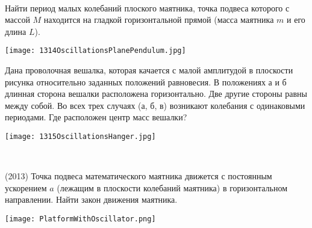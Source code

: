 \begin{ex}
\hspace{0pt} \\
\begin{minipage}{.65\textwidth} 
Найти период малых колебаний плоского маятника, точка подвеса которого с массой $M$ находится на гладкой горизонтальной прямой 
(масса маятника $m$ и его длина $L$).
\end{minipage}
\begin{minipage}{.35\textwidth}
\centering
\texttt{[image: 1314OscillationsPlanePendulum.jpg]}
\end{minipage}
\begin{ans}
\end{ans}
\end{ex}

\begin{ex}
Дана проволочная вешалка, которая качается с малой амплитудой в плоскости рисунка относительно заданных положений равновесия. 
В положениях а и б длинная сторона вешалки расположена горизонтально. Две другие стороны равны между собой. 
Во всех трех случаях (а, б, в) возникают колебания с одинаковыми периодами. Где расположен центр масс вешалки?
\begin{center}
\texttt{[image: 1315OscillationsHanger.jpg]}
\end{center}
\begin{ans}
\end{ans}
\end{ex}

\begin{ex}
\hspace{0pt} \\
\begin{minipage}{.65\textwidth}
(2013) Точка подвеса математического маятника движется с постоянным ускорением $a$ (лежащим в плоскости колебаний маятника) в горизонтальном направлении. Найти закон движения маятника.
\end{minipage}
\begin{minipage}{.35\textwidth}
\centering
\texttt{[image: PlatformWithOscillator.png]}
\end{minipage}
\begin{ans}
\end{ans}
\end{ex}

